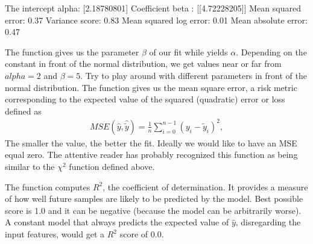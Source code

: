 \documentclass[letterpaper,10pt,english]{sphinxmanual}
\begin{document}
\begin{sphinxVerbatim}[commandchars=\\\{\}]
  
\PYG{p}{[} \PYG{p}{]}
\end{sphinxVerbatim}

\begin{sphinxVerbatim}[commandchars=\\\{\}]
The intercept alpha: 
 [2.18780801]
Coefficient beta : 
 [[4.72228205]]
Mean squared error: 0.37
Variance score: 0.83
Mean squared log error: 0.01
Mean absolute error: 0.47
\end{sphinxVerbatim}

\noindent{}

The function  gives us the parameter \(\beta\) of our fit while  yields
\(\alpha\). Depending on the constant in front of the normal distribution, we get values near or far from \(alpha =2\) and \(\beta =5\). Try to play around with different parameters in front of the normal distribution. The function  gives us the mean square error, a risk metric corresponding to the expected value of the squared (quadratic) error or loss defined as
\begin{equation*}
\begin{split}
MSE(\hat{y},\hat{\tilde{y}}) = \frac{1}{n}
\sum_{i=0}^{n-1}(y_i-\tilde{y}_i)^2,
\end{split}
\end{equation*}
The smaller the value, the better the fit. Ideally we would like to
have an MSE equal zero.  The attentive reader has probably recognized
this function as being similar to the \(\chi^2\) function defined above.

The  function computes \(R^2\), the coefficient of
determination. It provides a measure of how well future samples are
likely to be predicted by the model. Best possible score is 1.0 and it
can be negative (because the model can be arbitrarily worse). A
constant model that always predicts the expected value of \(\hat{y}\),
disregarding the input features, would get a \(R^2\) score of \(0.0\).
\end{document}
